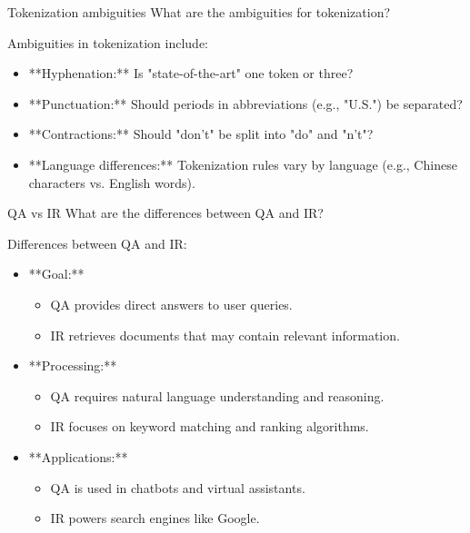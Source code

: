 \documentclass{article}
\begin{document}
\begin{exercise}{Tokenization ambiguities}
  What are the ambiguities for tokenization?

  \begin{solution}
    Ambiguities in tokenization include:
    \begin{itemize}
        \item **Hyphenation:** Is "state-of-the-art" one token or three?
        \item **Punctuation:** Should periods in abbreviations (e.g., "U.S.") be separated?
        \item **Contractions:** Should "don't" be split into "do" and "n't"?
        \item **Language differences:** Tokenization rules vary by language (e.g., Chinese characters vs. English words).
    \end{itemize}
  \end{solution}
\end{exercise}

\begin{exercise}{QA vs IR}
  What are the differences between QA and IR?

  \begin{solution}
    Differences between QA and IR:
    \begin{itemize}
        \item **Goal:**
        \begin{itemize}
            \item QA provides direct answers to user queries.
            \item IR retrieves documents that may contain relevant information.
        \end{itemize}
        \item **Processing:**
        \begin{itemize}
            \item QA requires natural language understanding and reasoning.
            \item IR focuses on keyword matching and ranking algorithms.
        \end{itemize}
        \item **Applications:**
        \begin{itemize}
            \item QA is used in chatbots and virtual assistants.
            \item IR powers search engines like Google.
        \end{itemize}
    \end{itemize}
  \end{solution}
\end{exercise}
\end{document}
